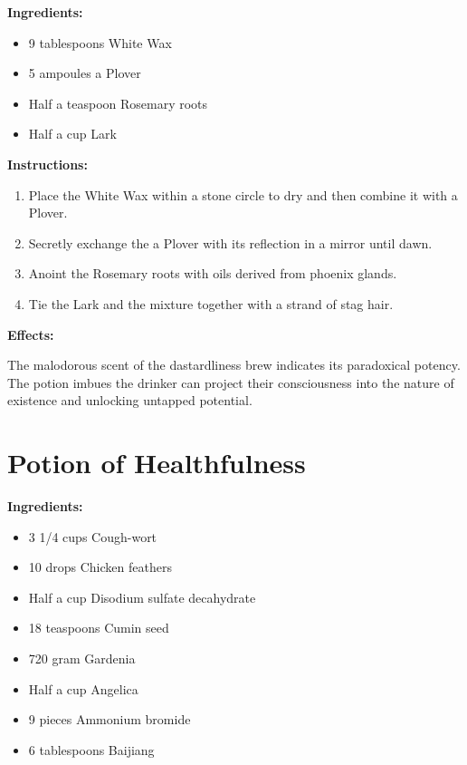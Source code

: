 \documentclass{article}
\begin{document}
\textbf{Ingredients:}

\begin{itemize}
  \item 9 tablespoons White Wax
  \item 5 ampoules a Plover
  \item Half a teaspoon Rosemary roots
  \item Half a cup Lark
\end{itemize}

\textbf{Instructions:}

\begin{enumerate}
  \item Place the White Wax within a stone circle to dry and then combine it with a Plover.
  \item Secretly exchange the a Plover with its reflection in a mirror until dawn.
  \item Anoint the Rosemary roots with oils derived from phoenix glands.
  \item Tie the Lark and the mixture together with a strand of stag hair.
\end{enumerate}

\textbf{Effects:}

The malodorous scent of the dastardliness brew indicates its paradoxical potency. The potion imbues the drinker can project their consciousness into the nature of existence and unlocking untapped potential.

\newpage
\section*{Potion of Healthfulness}

\textbf{Ingredients:}

\begin{itemize}
  \item 3 1/4 cups Cough-wort
  \item 10 drops Chicken feathers
  \item Half a cup Disodium sulfate decahydrate
  \item 18 teaspoons Cumin seed
  \item 720 gram Gardenia
  \item Half a cup Angelica
  \item 9 pieces Ammonium bromide
  \item 6 tablespoons Baijiang
\end{itemize}
\end{document}
